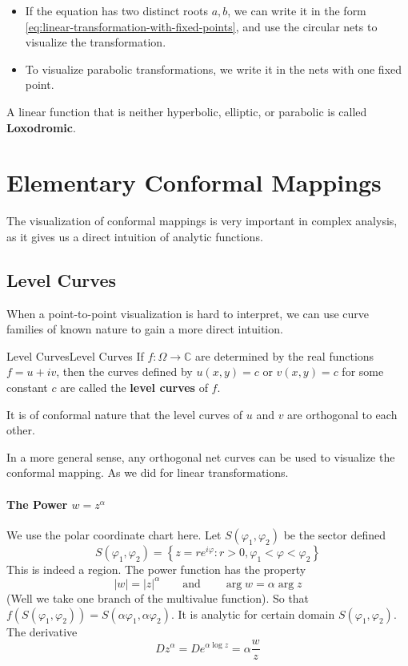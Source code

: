 \documentclass[../main.tex]{subfiles}
\begin{document}
\begin{itemize}
	\item If the equation has two distinct roots $a,b$, we can write it in the form \ref{eq:linear-transformation-with-fixed-points}, and use the circular nets to visualize the transformation.
	\item To visualize parabolic transformations, we write it in the nets with one fixed point.
\end{itemize}
A linear function that is neither hyperbolic, elliptic, or parabolic is called \textbf{Loxodromic}.

\section{Elementary Conformal Mappings}

The visualization of conformal mappings is very important in complex analysis, as it gives us a direct intuition of analytic functions.

\subsection{Level Curves}
When a point-to-point visualization is hard to interpret, we can use curve families of known nature to gain a more direct intuition.

\begin{definition}{Level Curves}{Level Curves}
	If $f: \Omega \rightarrow \mathbb{C}$ are determined by the real functions $f=u+iv$, then the curves defined by $u(x,y)=c$ or $v(x,y)=c$ for some constant $c$ are called the \textbf{level curves} of $f$.
\end{definition}
It is of conformal nature that the level curves of $u$ and $v$ are orthogonal to each other.

In a more general sense, any orthogonal net curves can be used to visualize the conformal mapping. As we did for linear transformations.

\paragraph{The Power $w = z^{\alpha}$}

We use the polar coordinate chart here. Let $S(\varphi_1,\varphi_2)$ be the sector defined
\begin{equation}
	S(\varphi_1,\varphi_2) = \left\{ z = re^{i\varphi} : r> 0, \varphi_1< \varphi < \varphi_2 \right\}
\end{equation}
This is indeed a region. The power function has the property
\begin{equation*}
	\left|w\right| = \left|z\right|^{\alpha} \qquad \text{and} \qquad \arg w = \alpha \arg z
\end{equation*}
(Well we take one branch of the multivalue function). So that $f(S(\varphi_1,\varphi_2)) = S(\alpha \varphi_1, \alpha \varphi_2)$. It is analytic for certain domain $S(\varphi_1,\varphi_2)$. The derivative
\begin{equation*}
D z^{\alpha} = D e^{\alpha \log z} = \alpha \frac{w}{z}
\end{equation*}
\end{document}
